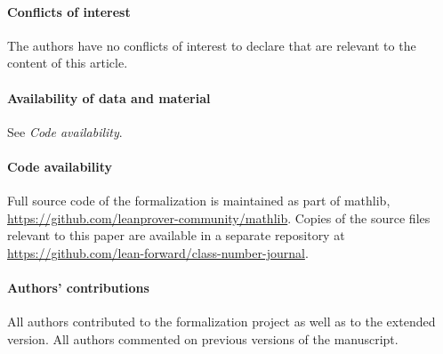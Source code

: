 \documentclass[sn-mathphys]{sn-jnl}%
\newcommand{\mathlib}{\textsf{mathlib}\xspace}
\begin{document}
\paragraph{Conflicts of interest}
The authors have no conflicts of interest to declare that are relevant to the content of this article.

\paragraph{Availability of data and material}
See \emph{Code availability}.

\paragraph{Code availability}
Full source code of the formalization is maintained as part of \mathlib, \url{https://github.com/leanprover-community/mathlib}. Copies of the source files relevant to this paper are available in a separate repository at \url{https://github.com/lean-forward/class-number-journal}.

\paragraph{Authors' contributions}
All authors contributed to the formalization project as well as to the extended version. All authors commented on previous versions of the manuscript.


\end{document}
